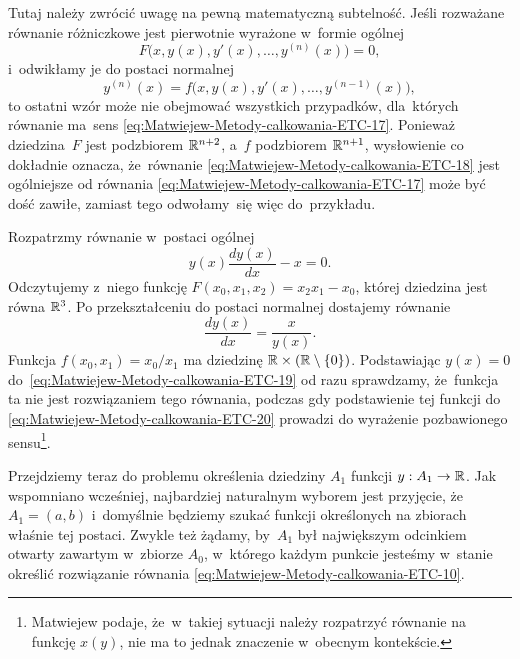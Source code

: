 \documentclass[a4paper,11pt]{article}
\numberwithin{equation}{section}
\begin{document}
Tutaj należy zwrócić uwagę na pewną matematyczną subtelność. Jeśli
rozważane równanie różniczkowe jest pierwotnie wyrażone w~formie ogólnej
\begin{equation}
  \label{eq:Matwiejew-Metody-calkowania-ETC-17}
  F\big( x, y( x ), y'( x ), \ldots, y^{ ( n ) }( x ) \big) = 0,
\end{equation}
i~odwikłamy je do postaci normalnej
\begin{equation}
  \label{eq:Matwiejew-Metody-calkowania-ETC-18}
  y^{ ( n ) }( x ) = f\big( x, y( x ), y'( x ), \ldots, y^{ ( n - 1 ) }( x ) \big),
\end{equation}
to ostatni wzór może nie obejmować wszystkich przypadków, dla~których
równanie ma~sens \eqref{eq:Matwiejew-Metody-calkowania-ETC-17}. Ponieważ
dziedzina~$F$ jest podzbiorem $\mathbb{R}^{ n + 2 }$, a~$f$ podzbiorem
$\mathbb{R}^{ n + 1 }$, wysłowienie co dokładnie oznacza, że~równanie
\eqref{eq:Matwiejew-Metody-calkowania-ETC-18}
jest ogólniejsze od równania \eqref{eq:Matwiejew-Metody-calkowania-ETC-17}
może być dość zawiłe, zamiast tego odwołamy~się więc do~przykładu.

Rozpatrzmy równanie w~postaci ogólnej
\begin{equation}
  \label{eq:Matwiejew-Metody-calkowania-ETC-19}
  y( x ) \frac{ d y( x ) }{ d x } - x = 0.
\end{equation}
Odczytujemy z~niego funkcję
$F( x_{ 0 }, x_{ 1 }, x_{ 2 } ) = x_{ 2 } x_{ 1 } - x_{ 0 }$, której dziedzina
jest równa $\mathbb{R}^{ 3 }$. Po przekształceniu do postaci normalnej dostajemy
równanie
\begin{equation}
  \label{eq:Matwiejew-Metody-calkowania-ETC-20}
  \frac{ d y( x ) }{ d x } = \frac{ x }{ y( x ) }.
\end{equation}
Funkcja $f( x_{ 0 }, x_{ 1 } ) = x_{ 0 } / x_{ 1 }$ ma dziedzinę
$\mathbb{R} \times ( \mathbb{R} \setminus \{ 0 \} )$. Podstawiając $y( x ) = 0$
do~\eqref{eq:Matwiejew-Metody-calkowania-ETC-19} od razu sprawdzamy,
że~funkcja ta nie jest rozwiązaniem tego równania, podczas gdy podstawienie
tej funkcji do \eqref{eq:Matwiejew-Metody-calkowania-ETC-20} prowadzi do
wyrażenie pozbawionego sensu\footnote{Matwiejew podaje, że~w~takiej
  sytuacji należy rozpatrzyć równanie na funkcję $x( y )$, nie ma to
  jednak znaczenie w~obecnym kontekście.}.

Przejdziemy teraz do problemu określenia dziedziny $A_{ 1 }$
funkcji $y : A_{ 1 } \to \mathbb{R}$. Jak wspomniano wcześniej, najbardziej
naturalnym wyborem jest przyjęcie, że~$A_{ 1 } = ( a, b )$ i~domyślnie
będziemy szukać funkcji określonych na zbiorach właśnie tej postaci. Zwykle
też żądamy, by~$A_{ 1 }$ był największym odcinkiem otwarty zawartym
w~zbiorze $A_{ 0 }$, w~którego każdym punkcie jesteśmy w~stanie określić
rozwiązanie równania \eqref{eq:Matwiejew-Metody-calkowania-ETC-10}.
\end{document}
